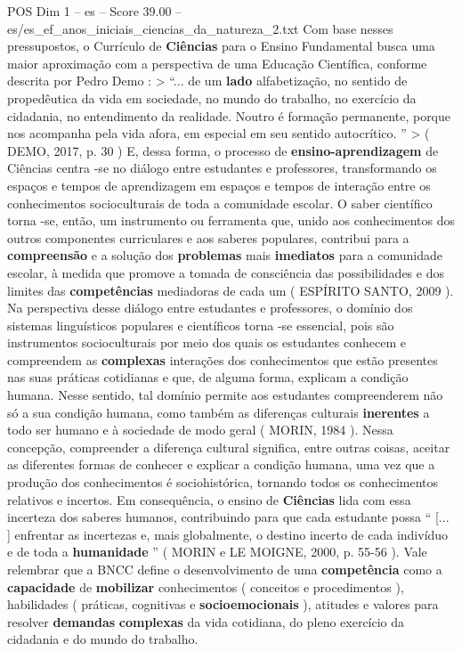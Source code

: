 \begin{textsample}{POS Dim 1 – es – Score 39.00 – es/es\_ef\_anos\_iniciais\_ciencias\_da\_natureza\_2.txt}
Com base nesses pressupostos, o Currículo de \textbf{Ciências} para o Ensino Fundamental busca uma maior aproximação com a perspectiva de uma Educação Científica, conforme descrita por Pedro Demo : > “... de um \textbf{lado} alfabetização, no sentido de propedêutica da vida em sociedade, no mundo do trabalho, no exercício da cidadania, no entendimento da realidade.
Noutro é formação permanente, porque nos acompanha pela vida afora, em especial em seu sentido autocrítico. ” > ( DEMO, 2017, p. 30 ) E, dessa forma, o processo de \textbf{ensino-aprendizagem} de Ciências centra -se no diálogo entre estudantes e professores, transformando os espaços e tempos de aprendizagem em espaços e tempos de interação entre os conhecimentos socioculturais de toda a comunidade escolar.
O saber científico torna -se, então, um instrumento ou ferramenta que, unido aos conhecimentos dos outros componentes curriculares e aos saberes populares, contribui para a \textbf{compreensão} e a solução dos \textbf{problemas} mais \textbf{imediatos} para a comunidade escolar, à medida que promove a tomada de consciência das possibilidades e dos limites das \textbf{competências} mediadoras de cada um ( ESPÍRITO SANTO, 2009 ).
Na perspectiva desse diálogo entre estudantes e professores, o domínio dos sistemas linguísticos populares e científicos torna -se essencial, pois são instrumentos socioculturais por meio dos quais os estudantes conhecem e compreendem as \textbf{complexas} interações dos conhecimentos que estão presentes nas suas práticas cotidianas e que, de alguma forma, explicam a condição humana.
Nesse sentido, tal domínio permite aos estudantes compreenderem não só a sua condição humana, como também as diferenças culturais \textbf{inerentes} a todo ser humano e à sociedade de modo geral ( MORIN, 1984 ).
Nessa concepção, compreender a diferença cultural significa, entre outras coisas, aceitar as diferentes formas de conhecer e explicar a condição humana, uma vez que a produção dos conhecimentos é sociohistórica, tornando todos os conhecimentos relativos e incertos.
Em consequência, o ensino de \textbf{Ciências} lida com essa incerteza dos saberes humanos, contribuindo para que cada estudante possa “ [... ] enfrentar as incertezas e, mais globalmente, o destino incerto de cada indivíduo e de toda a \textbf{humanidade} ” ( MORIN e LE MOIGNE, 2000, p. 55-56 ).
Vale relembrar que a BNCC define o desenvolvimento de uma \textbf{competência} como a \textbf{capacidade} de \textbf{mobilizar} conhecimentos ( conceitos e procedimentos ), habilidades ( práticas, cognitivas e \textbf{socioemocionais} ), atitudes e valores para resolver \textbf{demandas} \textbf{complexas} da vida cotidiana, do pleno exercício da cidadania e do mundo do trabalho.

\end{textsample}
